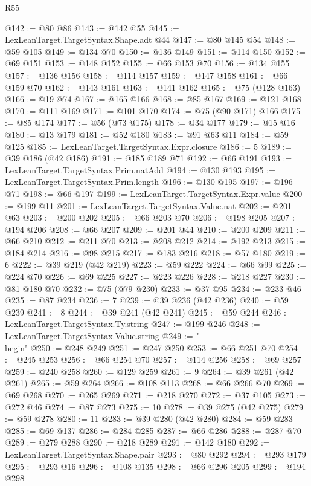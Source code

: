\begin{lexlean}{R55}
\begin{coremodule}
@142 := @80 @86
@143 := @142 @55
@145 := LexLeanTarget.TargetSyntax.Shape.adt @44
@147 := @80 @145 @54
@148 := @59 @105
@149 := @134 @70
@150 := @136 @149
@151 := @114 @150
@152 := @69 @151
@153 := @148 @152
@155 := @66 @153 @70
@156 := @134 @155
@157 := @136 @156
@158 := @114 @157
@159 := @147 @158
@161 := @66 @159 @70
@162 := @143 @161
@163 := @141 @162
@165 := @75 (@128 @163)
@166 := @19 @74
@167 := @165 @166
@168 := @85 @167
@169 := @121 @168
@170 := @111 @169
@171 := @101 @170
@174 := @75 (@90 @171) @166
@175 := @85 @174
@177 := @56 (@73 @175)
@178 := @34 @177
@179 := @15 @16
@180 := @13 @179
@181 := @52 @180
@183 := @91 @63 @11
@184 := @59 @125
@185 := LexLeanTarget.TargetSyntax.Expr.closure
@186 := 5
@189 := @39 @186 (@42 @186)
@191 := @185 @189 @71
@192 := @66 @191
@193 := LexLeanTarget.TargetSyntax.Prim.natAdd
@194 := @130 @193
@195 := LexLeanTarget.TargetSyntax.Prim.length
@196 := @130 @195
@197 := @196 @71
@198 := @66 @197
@199 := LexLeanTarget.TargetSyntax.Expr.value
@200 := @199 @11
@201 := LexLeanTarget.TargetSyntax.Value.nat
@202 := @201 @63
@203 := @200 @202
@205 := @66 @203 @70
@206 := @198 @205
@207 := @194 @206
@208 := @66 @207
@209 := @201 @44
@210 := @200 @209
@211 := @66 @210
@212 := @211 @70
@213 := @208 @212
@214 := @192 @213
@215 := @184 @214
@216 := @98 @215
@217 := @183 @216
@218 := @57 @180
@219 := 6
@222 := @39 @219 (@42 @219)
@223 := @59 @222
@224 := @66 @99
@225 := @224 @70
@226 := @69 @225
@227 := @223 @226
@228 := @218 @227
@230 := @81 @180 @70
@232 := @75 (@79 @230)
@233 := @37 @95
@234 := @233 @46
@235 := @87 @234
@236 := 7
@239 := @39 @236 (@42 @236)
@240 := @59 @239
@241 := 8
@244 := @39 @241 (@42 @241)
@245 := @59 @244
@246 := LexLeanTarget.TargetSyntax.Ty.string
@247 := @199 @246
@248 := LexLeanTarget.TargetSyntax.Value.string
@249 := "\\begin"
@250 := @248 @249
@251 := @247 @250
@253 := @66 @251 @70
@254 := @245 @253
@256 := @66 @254 @70
@257 := @114 @256
@258 := @69 @257
@259 := @240 @258
@260 := @129 @259
@261 := 9
@264 := @39 @261 (@42 @261)
@265 := @59 @264
@266 := @108 @113
@268 := @66 @266 @70
@269 := @69 @268
@270 := @265 @269
@271 := @218 @270
@272 := @37 @105
@273 := @272 @46
@274 := @87 @273
@275 := 10
@278 := @39 @275 (@42 @275)
@279 := @59 @278
@280 := 11
@283 := @39 @280 (@42 @280)
@284 := @59 @283
@285 := @69 @137
@286 := @284 @285
@287 := @66 @286
@288 := @287 @70
@289 := @279 @288
@290 := @218 @289
@291 := @142 @180
@292 := LexLeanTarget.TargetSyntax.Shape.pair
@293 := @80 @292
@294 := @293 @179
@295 := @293 @16
@296 := @108 @135
@298 := @66 @296 @205
@299 := @194 @298

\end{coremodule}
\end{lexlean}
